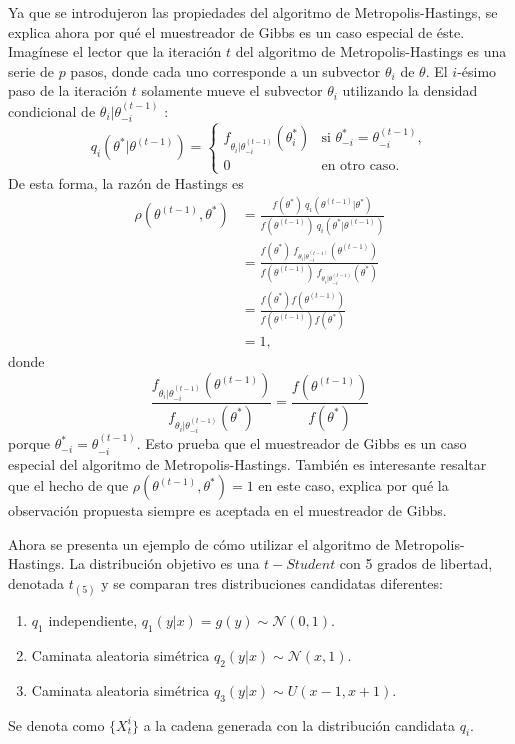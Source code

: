 \documentclass[11pt,a4paper]{article}
\begin{document}
Ya que se introdujeron las propiedades del algoritmo de Metropolis-Hastings, se explica ahora por qué el muestreador de Gibbs es un caso especial de éste. Imagínese el lector que la iteración $t$ del algoritmo de Metropolis-Hastings es una serie de $p$ pasos, donde cada uno corresponde a un subvector $\theta_i$ de $\theta$. El $i$-ésimo paso de la iteración $t$ solamente mueve el subvector $\theta_i$ utilizando la densidad condicional de $\theta_i | \theta^{(t-1)}_{-i}$ \citep{gelman}:
$$q_i(\theta^* | \theta^{(t-1)}) = \begin{cases}
f_{\theta_i | \theta_{-i}^{(t-1)}} (\theta^*_{i}) & \text{si } \theta^*_{-i} = \theta^{(t-1)}_{-i},\\
0 & \text{en otro caso.} \end{cases}$$ De esta forma, la razón de Hastings es
\begin{align*}
\rho(\theta^{(t-1)}, \theta^*) &= \frac{f(\theta^*) \ q_i(\theta^{(t-1)}|\theta^*)}{f(\theta^{(t-1)}) \ q_i(\theta^*|\theta^{(t-1)})}\\
&= \frac{f(\theta^*) \ f_{\theta_i|\theta_{-i}^{(t-1)}}(\theta^{(t-1)})}{f(\theta^{(t-1)}) \ f_{\theta_i|\theta_{-i}^{(t-1)}}(\theta^*)}\\
&= \frac{f(\theta^*)f(\theta^{(t-1)})}{f(\theta^{(t-1)})f(\theta^*)}\\
&= 1,
\end{align*}
donde $$\frac{f_{\theta_i|\theta_{-i}^{(t-1)}}(\theta^{(t-1)})}{f_{\theta_i|\theta_{-i}^{(t-1)}}(\theta^*)} = \frac{f(\theta^{(t-1)})}{f(\theta^*)}$$ porque $\theta_{-i}^* = \theta_{-i}^{(t-1)}$. Esto prueba que el muestreador de Gibbs es un caso especial del algoritmo de Metropolis-Hastings. También es interesante resaltar que el hecho de que  $\rho(\theta^{(t-1)}, \theta^*) = 1$ en este caso, explica por qué la observación propuesta siempre es aceptada en el muestreador de Gibbs.

Ahora se presenta un ejemplo de cómo utilizar el algoritmo de Metropolis-Hastings. La distribución objetivo es una $t-Student$ con 5 grados de libertad, denotada $t_{(5)}$ y se comparan tres distribuciones candidatas diferentes:
\begin{enumerate}
\item $q_1$ independiente, $q_1(y|x) = g(y) \sim \mathcal{N}(0, 1).$
\item Caminata aleatoria simétrica $q_2(y|x) \sim \mathcal{N}(x, 1).$
\item Caminata aleatoria simétrica $q_3(y|x) \sim U(x - 1, x + 1).$
\end{enumerate}
Se denota como $\lbrace X_t^i \rbrace$ a la cadena generada con la distribución candidata $q_i$.
\end{document}
